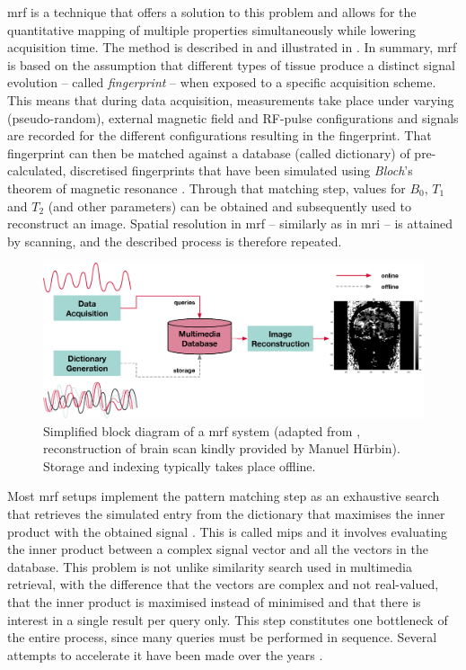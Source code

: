 \acrfull{mrf} is a technique \cite{Ma:2013Magnetic} that offers a solution to this problem and allows for the quantitative mapping of multiple properties simultaneously while lowering acquisition time. The method is described in \cite{Bipin:2019Magnetic} and illustrated in . In summary, \acrshort{mrf} is based on the assumption that different types of tissue produce a distinct signal evolution -- called \emph{fingerprint} -- when exposed to a specific acquisition scheme. This means that during data acquisition, measurements take place under varying (pseudo-random), external magnetic field and RF-pulse configurations and signals are recorded for the different configurations resulting in the fingerprint. That fingerprint can then be matched against a database (called dictionary) of pre-calculated, discretised fingerprints that have been simulated using \emph{Bloch}'s theorem of magnetic resonance \cite{Bloch:1946Nuclear}. Through that matching step, values for $B_0$, $T_1$ and $T_2$ (and other parameters) can be obtained and subsequently used to reconstruct an image. Spatial resolution in \acrshort{mrf} -- similarly as in \acrshort{mri} -- is attained by scanning, and the described process is therefore repeated.

\begin{figure}[tb]
    \centering
    \includegraphics[width=\textwidth]{figures/mrf.eps}
    \caption{Simplified block diagram of a \acrshort{mrf} system (adapted from \cite{Bipin:2019Magnetic}, reconstruction of brain scan kindly provided by Manuel Hürbin). Storage and indexing typically takes place offline.}
    \label{figure:mrf}
\end{figure}

Most \acrshort{mrf} setups implement the pattern matching step as an exhaustive search that retrieves the simulated entry from the dictionary that maximises the inner product with the obtained signal \cite{Bipin:2019Magnetic}. This is called \acrfull{mips} and it involves evaluating the inner product between a complex signal vector and all the vectors in the database. This problem is not unlike similarity search used in multimedia retrieval, with the difference that the vectors are complex and not real-valued, that the inner product is maximised instead of minimised and that there is interest in a single result per query only. This step constitutes one bottleneck of the entire process, since many queries must be performed in sequence. Several attempts to accelerate it have been made over the years \cite{Mcgivney:2014SVD,Cauley:2015Fast,Cohen:2018MR}.


